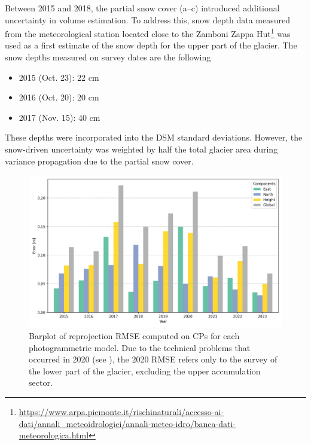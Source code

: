 Between 2015 and 2018, the partial snow cover (a--c) introduced
additional uncertainty in volume estimation. 
To address this, snow depth data measured from the meteorological station located close 
to the Zamboni Zappa 
Hut\footnote{\url{https://www.arpa.piemonte.it/rischinaturali/accesso-ai-dati/annali_meteoidrologici/annali-meteo-idro/banca-dati-meteorologica.html}} was used as a first estimate of the snow depth for the upper part of the glacier. 
The snow depths measured on survey dates are the following
\begin{itemize}
    \item 2015 (Oct. 23): 22 cm
    \item 2016 (Oct. 20): 20 cm
    \item 2017 (Nov. 15): 40 cm
\end{itemize}
These depths were incorporated into the DSM standard deviations. 
However, the snow-driven uncertainty was weighted by half the total glacier area during variance propagation due to the partial snow cover.

\begin{figure}[ht]
    \centering
    \includegraphics[width=0.9\columnwidth]{uav_cp_error.png}
    \caption{Barplot of reprojection RMSE computed on CPs for each photogrammetric
        model. Due to the technical problems that occurred in 2020 
        (see ), the 2020 RMSE refers only to the survey of
        the lower part of the glacier, excluding the upper accumulation sector.
    }
    \label{fig:3:CP_errors}
\end{figure}

